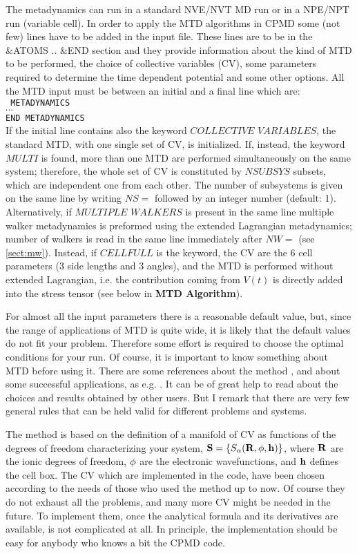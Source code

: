 \documentclass[twoside,10pt,titlepage,a4paper]{article}
\begin{document}
The metadynamics can run in a standard NVE/NVT MD run or in a NPE/NPT run (variable cell).
In order to apply the MTD algorithms in CPMD some (not few) lines have to be added in
the input file.
These lines are to be in the \&ATOMS .. \&END section and they provide information about
the kind of MTD to be performed, the choice of collective variables (CV),
some parameters required to determine the time dependent potential
and some other options.
All the MTD input must be between an initial and a final line which are: \\
{\tt
METADYNAMICS \\
$\cdots$ \\
END METADYNAMICS }\\
If the initial line contains also the keyword $COLLECTIVE $ $ VARIABLES$,
the standard MTD, with one single set of CV, is initialized.
If, instead, the keyword  $MULTI$ is found, more than one MTD are performed
simultaneously on the same system; therefore, the whole set of CV is constituted
by $NSUBSYS$ subsets, which are independent one from each other.
The number of subsystems is given on the same line by writing $NS=$ followed
by an integer number  (default: 1). Alternatively, if $MULTIPLE$ $WALKERS$ is present in 
the same line multiple walker metadynamics is preformed using the extended Lagrangian
metadynamics; number of walkers is read in the same line immediately after $NW=$ (see \ref{sect:mw}).
Instead, if  $CELL  FULL$ is the
keyword, the CV are the 6 cell parameters (3 side lengths and 3 angles),
and the MTD is performed without extended Lagrangian, i.e.
the contribution coming from $V(t)$ is directly added into the stress
tensor (see below in {\bf MTD Algorithm}). 

For almost all the input parameters there is a reasonable
default value, but, since the range of applications of MTD is quite wide, it is likely that
the default values do not fit your problem. Therefore some effort is required to choose the
optimal conditions for your run.
Of course, it is important to know something about MTD before using it. There are some references
about the method \cite{alaio, iannuzzi, micheletti, gerlaio, michele}, and about some successful
applications, as e.g. \cite{andras, gervasio, iannuzzi2, sergey, scwo, ikeda, rna, Nair-jacs-08, mb11}.
It can be of great help to read about the choices and results obtained by other users.
But I remark that there are very few general rules that can be held valid for different
problems and systems.

The method is based on the definition of a manifold of CV as functions of the
degrees of freedom characterizing your system,
${\bf S} = \{S_{\alpha}({\bf R},{\bf \phi},{\bf h})\}$, where ${\bf R}$ are the ionic
degrees of freedom, ${\bf \phi}$ are the electronic wavefunctions, and
${\bf h}$ defines the cell box.
The CV which are implemented in the code, have been chosen according to the needs of those
who used the method up to now. Of course they do not exhaust all the problems, and many more
CV might be needed in the future. To implement them, once the analytical
formula and its derivatives are available,
is not complicated at all. In principle, the implementation should be easy for
anybody who knows a bit the CPMD code.
\end{document}

